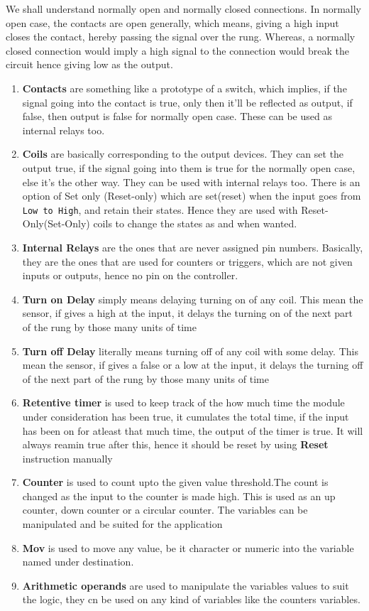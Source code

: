 \documentclass[12pt]{article}
\begin{document}
We shall understand normally open and normally closed connections. In normally open case, the contacts are open generally, which means, giving a high input closes the contact, hereby passing the signal over the rung. Whereas, a normally closed connection would imply a high signal to the connection would break the circuit hence giving low as the output.\vspace{12pt}
\begin{enumerate} 
\item {\textbf{Contacts} are something like a prototype of a switch, which implies, if the signal going into the contact is true, only then it'll be reflected as output, if false, then output is false for normally open case.  These can be used as internal relays too. }
\item{ \textbf{Coils} are basically corresponding to the output devices. They can set the output true, if the signal going into them is true for the normally open case, else it's the other way. They can be used with internal relays too. There is an option of Set only (Reset-only) which are set(reset) when the input goes from \texttt{Low to High}, and retain their states. Hence they are used with Reset-Only(Set-Only) coils to change the states as and when wanted. }
\item{ \textbf{Internal Relays} are the ones that are never assigned pin numbers. Basically, they are the ones that are used for counters or triggers, which are not given inputs or outputs, hence no pin on the controller.}
\item{ \textbf{Turn on Delay} simply means delaying turning on of any coil. This mean the sensor, if gives a high at the input, it delays the turning on of the next part of the rung by those many units of time}
\item{ \textbf{Turn off Delay} literally means turning off of any coil with some delay. This mean the sensor, if gives a false or a low at the input, it delays the turning off of the next part of the rung by those many units of time}

\item{ \textbf{Retentive timer} is used to keep track of the how much time the module under consideration has been true, it cumulates the total time, if the input has been on for atleast that much time, the output of the timer is true. It will always reamin true after this, hence it should be reset by using \textbf{Reset} instruction manually}

\item{ \textbf{Counter} is used to count upto the given value threshold.The count is changed as the input to the counter is made high. This is used as an up counter, down counter or a circular counter. The variables can be manipulated and be suited for the application}
\item{ \textbf{Mov} is used to move any value, be it character or numeric into the variable named under destination.}
\item{ \textbf{Arithmetic operands} are used to manipulate the variables values to suit the logic, they cn be used on any kind of variables like the counters variables.}


\end{enumerate}
\end{document}
